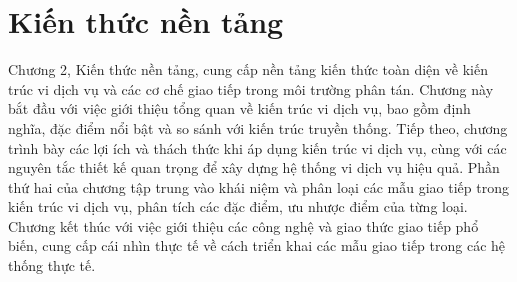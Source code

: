 \chapter{Kiến thức nền tảng}

Chương 2, Kiến thức nền tảng, cung cấp nền tảng kiến thức toàn diện về kiến trúc vi dịch vụ và các cơ chế giao tiếp trong môi trường phân tán. Chương này bắt đầu với việc giới thiệu tổng quan về kiến trúc vi dịch vụ, bao gồm định nghĩa, đặc điểm nổi bật và so sánh với kiến trúc truyền thống. Tiếp theo, chương trình bày các lợi ích và thách thức khi áp dụng kiến trúc vi dịch vụ, cùng với các nguyên tắc thiết kế quan trọng để xây dựng hệ thống vi dịch vụ hiệu quả. Phần thứ hai của chương tập trung vào khái niệm và phân loại các mẫu giao tiếp trong kiến trúc vi dịch vụ, phân tích các đặc điểm, ưu nhược điểm của từng loại. Chương kết thúc với việc giới thiệu các công nghệ và giao thức giao tiếp phổ biến, cung cấp cái nhìn thực tế về cách triển khai các mẫu giao tiếp trong các hệ thống thực tế.




 